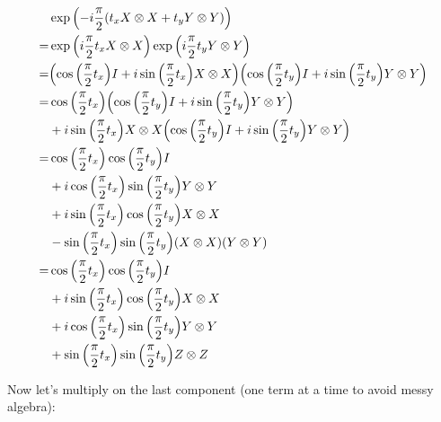 \documentclass{article}
\begin{document}
\begin{align*}
  & \exp\pqty{-i\frac{\pi}{2}\pqty{t_x X\otimes X + t_y Y\otimes Y}} \\
  =& \exp\pqty{i\frac{\pi}{2}t_x X\otimes X} \exp\pqty{i\frac{\pi}{2}t_y Y\otimes Y} \\
  =& \pqty{\cos\pqty{\frac{\pi}{2}t_x} I + i\sin\pqty{\frac{\pi}{2}t_x} X\otimes X}
  \pqty{\cos\pqty{\frac{\pi}{2}t_y} I + i\sin\pqty{\frac{\pi}{2}t_y} Y\otimes Y} \\
  =& \cos\pqty{\frac{\pi}{2}t_x}\pqty{\cos\pqty{\frac{\pi}{2}t_y} I + i\sin\pqty{\frac{\pi}{2}t_y} Y\otimes Y} 
  \\&+
  i\sin\pqty{\frac{\pi}{2}t_x} X\otimes X\pqty{\cos\pqty{\frac{\pi}{2}t_y} I + i\sin\pqty{\frac{\pi}{2}t_y} Y\otimes Y}
  \\
  =& \cos\pqty{\frac{\pi}{2}t_x}\cos\pqty{\frac{\pi}{2}t_y} I
  \\&+ i\cos\pqty{\frac{\pi}{2}t_x}\sin\pqty{\frac{\pi}{2}t_y} Y\otimes Y 
  \\&+
  i\sin\pqty{\frac{\pi}{2}t_x} \cos\pqty{\frac{\pi}{2}t_y} X\otimes X
  \\&- \sin\pqty{\frac{\pi}{2}t_x} \sin\pqty{\frac{\pi}{2}t_y} \pqty{X\otimes X}\pqty{Y\otimes Y}
  \\
  =& \cos\pqty{\frac{\pi}{2}t_x}\cos\pqty{\frac{\pi}{2}t_y} I
  \\&+ i\sin\pqty{\frac{\pi}{2}t_x} \cos\pqty{\frac{\pi}{2}t_y} X\otimes X
  \\&+ i\cos\pqty{\frac{\pi}{2}t_x}\sin\pqty{\frac{\pi}{2}t_y} Y\otimes Y 
  \\&+ \sin\pqty{\frac{\pi}{2}t_x} \sin\pqty{\frac{\pi}{2}t_y} Z\otimes Z
\end{align*}

Now let's multiply on the last component (one term at a time to avoid messy algebra):
\end{document}
